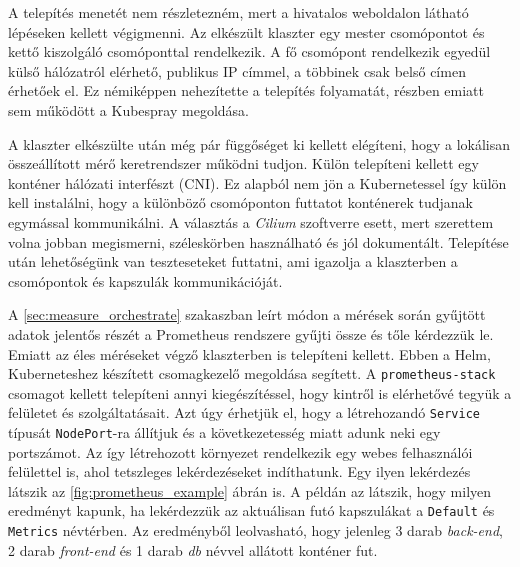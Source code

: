 A telepítés menetét nem részletezném, mert a hivatalos weboldalon látható lépéseken kellett végigmenni. Az elkészült klaszter egy mester csomópontot és kettő kiszolgáló csomóponttal rendelkezik. A fő csomópont rendelkezik egyedül külső hálózatról elérhető, publikus IP címmel, a többinek csak belső címen érhetőek el. Ez némiképpen nehezítette a telepítés folyamatát, részben emiatt sem működött a Kubespray megoldása. 

A klaszter elkészülte után még pár függőséget ki kellett elégíteni, hogy a lokálisan összeállított mérő keretrendszer működni tudjon. Külön telepíteni kellett egy konténer hálózati interfészt (CNI). Ez alapból nem jön a Kubernetessel így külön kell instalálni, hogy a különböző csomóponton futtatot konténerek tudjanak egymással kommunikálni. A választás a \textit{Cilium} szoftverre esett, mert szerettem volna jobban megismerni, széleskörben használható és jól dokumentált. Telepítése után lehetőségünk van teszteseteket futtatni, ami igazolja a klaszterben a csomópontok és kapszulák kommunikációját. 

A \ref{sec:measure_orchestrate} szakaszban leírt módon a mérések során gyűjtött adatok jelentős részét a Prometheus rendszere gyűjti össze és tőle kérdezzük le. Emiatt az éles méréseket végző klaszterben is telepíteni kellett. Ebben a Helm, Kuberneteshez készített csomagkezelő megoldása segített. A \verb+prometheus-stack+ csomagot kellett telepíteni annyi kiegészítéssel, hogy kintről is elérhetővé tegyük a felületet és szolgáltatásait. Azt úgy érhetjük el, hogy a létrehozandó \verb+Service+  típusát \verb+NodePort+-ra állítjuk és a következetesség miatt adunk neki egy portszámot. Az így létrehozott környezet rendelkezik egy webes felhasználói felülettel is, ahol tetszleges lekérdezéseket indíthatunk. Egy ilyen lekérdezés látszik az \ref{fig:prometheus_example} ábrán is. A példán az látszik, hogy milyen eredményt kapunk, ha lekérdezzük az aktuálisan futó kapszulákat a \verb+Default+ és \verb+Metrics+ névtérben. Az eredményből leolvasható, hogy jelenleg 3 darab \textit{back-end}, 2 darab \textit{front-end} és 1 darab \textit{db} névvel allátott konténer fut. \\

